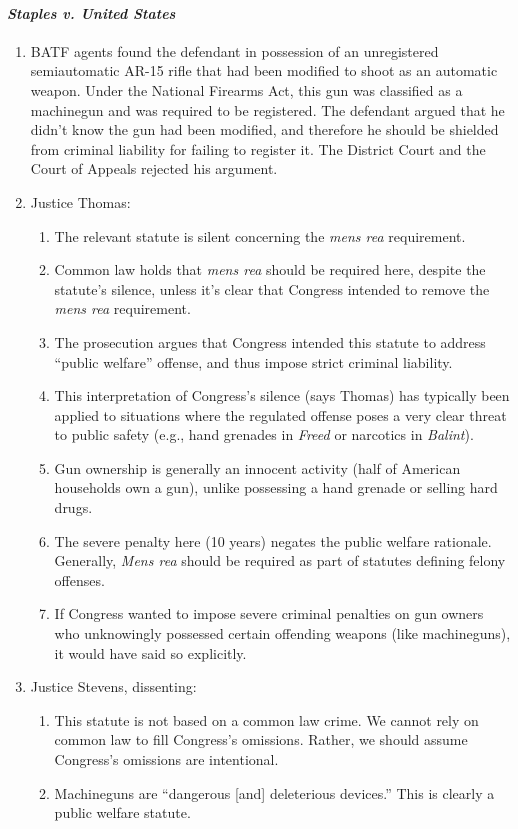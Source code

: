 \paragraph{\emph{Staples v. United States}}

\begin{enumerate}
    \item BATF agents found the defendant in possession of an unregistered semiautomatic AR-15 rifle that had been modified to shoot as an automatic weapon. Under the National Firearms Act, this gun was classified as a machinegun and was required to be registered. The defendant argued that he didn't know the gun had been modified, and therefore he should be shielded from criminal liability for failing to register it. The District Court and the Court of Appeals rejected his argument.
    \item Justice Thomas:
    \begin{enumerate}
        \item The relevant statute is silent concerning the \emph{mens rea} requirement.
        \item Common law holds that \emph{mens rea} should be required here, despite the statute's silence, unless it's clear that Congress intended to remove the \emph{mens rea} requirement.
        \item The prosecution argues that Congress intended this statute to address ``public welfare'' offense, and thus impose strict criminal liability.
        \item This interpretation of Congress's silence (says Thomas) has typically been applied to situations where the regulated offense poses a very clear threat to public safety (e.g., hand grenades in \emph{Freed} or narcotics in \emph{Balint}). 
        \item Gun ownership is generally an innocent activity (half of American households own a gun), unlike possessing a hand grenade or selling hard drugs.
        \item The severe penalty here (10 years) negates the public welfare rationale. Generally, \emph{Mens rea} should be required as part of statutes defining felony offenses.
        \item If Congress wanted to impose severe criminal penalties on gun owners who unknowingly possessed certain offending weapons (like machineguns), it would have said so explicitly.
    \end{enumerate}
    \item Justice Stevens, dissenting:
    \begin{enumerate}
        \item This statute is not based on a common law crime. We cannot rely on common law to fill Congress's omissions. Rather, we should assume Congress's omissions are intentional.
        \item Machineguns are ``dangerous [and] deleterious devices.'' This is clearly a public welfare statute.
    \end{enumerate}
\end{enumerate}

